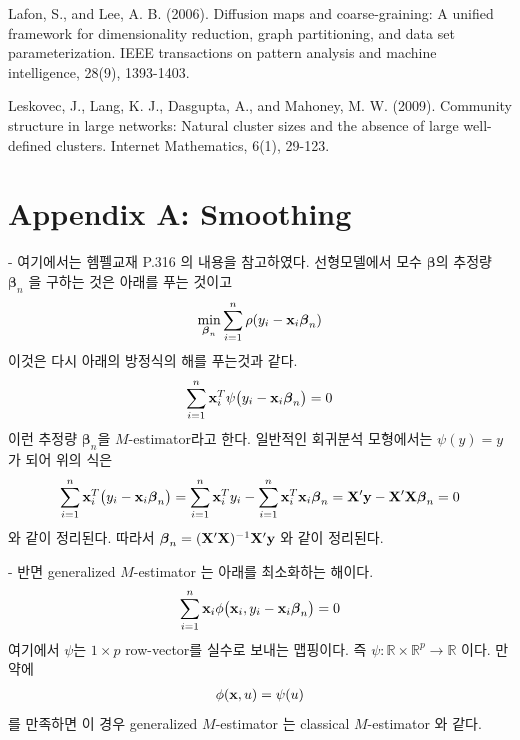 \documentclass[preprint, review, 12pt]{article}
\theoremstyle{definition}
\theoremstyle{remark}
\begin{document}
\begin{thebibliography}{}
 Lafon, S., and Lee, A. B. (2006). Diffusion maps and coarse-graining: A unified framework for dimensionality reduction, graph partitioning, and data set parameterization. IEEE transactions on pattern analysis and machine intelligence, 28(9), 1393-1403.

 Leskovec, J., Lang, K. J., Dasgupta, A., and Mahoney, M. W. (2009). Community structure in large networks: Natural cluster sizes and the absence of large well-defined clusters. Internet Mathematics, 6(1), 29-123.

\end{thebibliography}


\newpage
\section*{Appendix A: Smoothing}
\iffalse
- 여기에서는 헴펠교재 P.316 의 내용을 참고하였다. 선형모델에서 모수 $\boldsymbol{\beta}$의 추정량 $\boldsymbol{\beta}_ n$ 을 구하는 것은 아래를 푸는 것이고 
\begin{align}
\min_{\boldsymbol{\beta}_ n}\sum_{i=1}^{n}\rho(y_i-{\bf x}_ i \boldsymbol{\beta}_ n)
\end{align}
이것은 다시 아래의 방정식의 해를 푸는것과 같다. 
\begin{align}
\sum_{i=1}^{n}{\bf x}_ i^T\psi\big(y_i-{\bf x}_ i \boldsymbol{\beta}_ n\big)=0 
\end{align}
이런 추정량 $\boldsymbol{\beta}_ n$을 $M$-estimator라고 한다. 일반적인 회귀분석 모형에서는 $\psi(y)=y$ 가 되어 위의 식은 
\begin{align}
\sum_{i=1}^{n}{\bf x}_ i^T\big(y_i-{\bf x}_ i \boldsymbol{\beta}_ n\big)=\sum_{i=1}^{n}{\bf x}_ i^T y_i-\sum_{i=1}^{n}{\bf x}_ i^T {\bf x}_ i \boldsymbol{\beta}_ n= {\bf X}'{\bf y}-{\bf X}'{\bf X}\boldsymbol{\beta}_ n=0 
\end{align}
와 같이 정리된다. 따라서 $\boldsymbol{\beta}_ n = ({\bf X}'{\bf X})^{-1}{\bf X}'{\bf y}$ 와 같이 정리된다.

- 반면 generalized $M$-estimator 는 아래를 최소화하는 해이다. 
\begin{align}
\sum_{i=1}^{n}{\bf x}_ i \phi\big({\bf x}_ i , y_i-{\bf x}_ i \boldsymbol{\beta}_ n\big) =0 
\end{align}
여기에서 $\psi$는 $1\times p$ row-vector를 실수로 보내는 맵핑이다. 즉 $\psi:\mathbb{R}\times \mathbb{R}^p \to \mathbb{R}$ 이다. 만약에 
\begin{align}
\phi({\bf x},u)=\psi(u)
\end{align}
를 만족하면 이 경우 generalized $M$-estimator 는 classical $M$-estimator 와 같다. 
\end{document}
